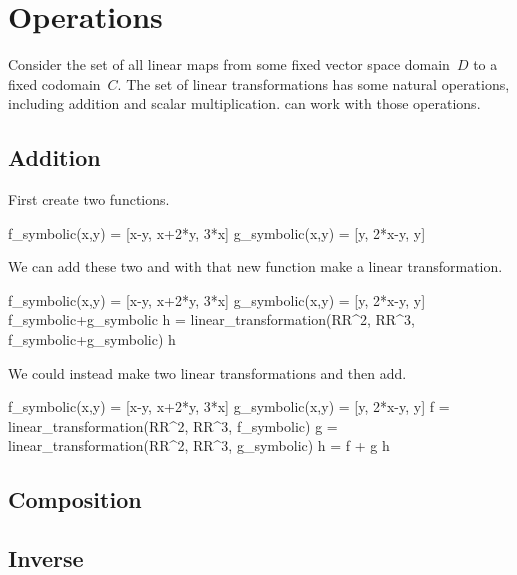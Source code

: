 \section{Operations}

Consider the set of all linear maps from some 
fixed vector space domain~$D$ to a fixed codomain~$C$. 
The set of linear transformations has some natural operations, including
addition and scalar multiplication.
\Sage{} can work with those operations.

\subsection{Addition}
First create two functions. 
\begin{sageoutput}
f_symbolic(x,y) = [x-y, x+2*y, 3*x]  
g_symbolic(x,y) = [y, 2*x-y, y]  
\end{sageoutput}
We can add these two and with that new function make a linear 
transformation.
\begin{sageoutput}[d,0,2;s,9,68,62;s,10,70,62]
f_symbolic(x,y) = [x-y, x+2*y, 3*x]  
g_symbolic(x,y) = [y, 2*x-y, y]  
f_symbolic+g_symbolic
h = linear_transformation(RR^2, RR^3, f_symbolic+g_symbolic)
h
\end{sageoutput}
We could instead make two linear transformations and then add.
\begin{sageoutput}[d,0,2;s,9,68,62;s,10,70,62]
f_symbolic(x,y) = [x-y, x+2*y, 3*x]  
g_symbolic(x,y) = [y, 2*x-y, y]  
f = linear_transformation(RR^2, RR^3, f_symbolic)
g = linear_transformation(RR^2, RR^3, g_symbolic)
h = f + g
h
\end{sageoutput}





\subsection{Composition}

\subsection{Inverse}




\endinput


TODO:
